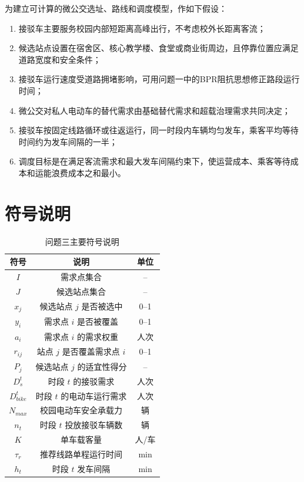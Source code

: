 \documentclass[UTF8,zihao=-4,a4paper]{ctexart}
\begin{document}
为建立可计算的微公交选址、路线和调度模型，作如下假设：
\begin{enumerate}
    \item 接驳车主要服务校园内部短距离高峰出行，不考虑校外长距离客流；
    \item 候选站点设置在宿舍区、核心教学楼、食堂或商业街周边，且停靠位置应满足道路宽度和安全条件；
    \item 接驳车运行速度受道路拥堵影响，可用问题一中的BPR阻抗思想修正路段运行时间；
    \item 微公交对私人电动车的替代需求由基础替代需求和超载治理需求共同决定；
    \item 接驳车按固定线路循环或往返运行，同一时段内车辆均匀发车，乘客平均等待时间约为发车间隔的一半；
    \item 调度目标是在满足客流需求和最大发车间隔约束下，使运营成本、乘客等待成本和运能浪费成本之和最小。
\end{enumerate}

\section{符号说明}

\begin{table}[H]
\centering
\caption{问题三主要符号说明}
\label{tab:symbols_q3}
\begin{tabular}{ccc}
\toprule
\textbf{符号} & \textbf{说明} & \textbf{单位} \\
\midrule
$I$ & 需求点集合 & -- \\
$J$ & 候选站点集合 & -- \\
$x_j$ & 候选站点 $j$ 是否被选中 & 0--1 \\
$y_i$ & 需求点 $i$ 是否被覆盖 & 0--1 \\
$a_i$ & 需求点 $i$ 的需求权重 & 人次 \\
$r_{ij}$ & 站点 $j$ 是否覆盖需求点 $i$ & 0--1 \\
$P_j$ & 候选站点 $j$ 的适宜性得分 & -- \\
$D_s^t$ & 时段 $t$ 的接驳需求 & 人次 \\
$D_{bike}^t$ & 时段 $t$ 的电动车运行需求 & 人次 \\
$N_{max}$ & 校园电动车安全承载力 & 辆 \\
$n_t$ & 时段 $t$ 投放接驳车辆数 & 辆 \\
$K$ & 单车载客量 & 人/车 \\
$\tau_r$ & 推荐线路单程运行时间 & min \\
$h_t$ & 时段 $t$ 发车间隔 & min \\
\bottomrule
\end{tabular}
\end{table}
\end{document}
